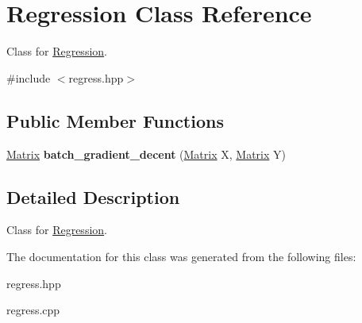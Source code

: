 \hypertarget{classRegression}{\section{Regression Class Reference}
\label{classRegression}
}


Class for \hyperlink{classRegression}{Regression}.  




{\ttfamily \#include $<$regress.\-hpp$>$}

\subsection*{Public Member Functions}
\begin{DoxyCompactItemize}
\item 
\hypertarget{classRegression_a4ee76faa5991c91e587da10e410dc026}{\hyperlink{classMatrix}{Matrix} {\bfseries batch\-\_\-gradient\-\_\-decent} (\hyperlink{classMatrix}{Matrix} X, \hyperlink{classMatrix}{Matrix} Y)}\label{classRegression_a4ee76faa5991c91e587da10e410dc026}

\end{DoxyCompactItemize}


\subsection{Detailed Description}
Class for \hyperlink{classRegression}{Regression}. 

The documentation for this class was generated from the following files\-:\begin{DoxyCompactItemize}
\item 
regress.\-hpp\item 
regress.\-cpp\end{DoxyCompactItemize}

